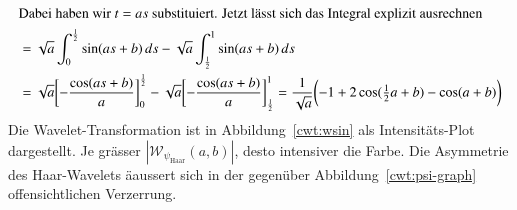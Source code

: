 \begin{beispiel}
\begin{align*}
\intertext{Dabei haben wir $t=as$ substituiert.
Jetzt lässt sich das Integral explizit ausrechnen}
&=
\sqrt{a}
\int_{0}^{\frac12} \sin(as+b)\,ds
-
\sqrt{a}
\int_{\frac12}^{1} \sin(as+b)\,ds
\\
&=
\sqrt{a}
\biggl[-\frac{\cos(as+b)}{a}\biggr]_{0}^{\frac12}
-
\sqrt{a}
\biggl[-\frac{\cos(as+b)}{a}\biggr]_{\frac12}^1
=
\frac{1}{\sqrt{a}}\biggl(
-1 + 2\cos({\textstyle\frac12}a+b) - \cos(a+b)
\biggr)
\end{align*}
Die Wavelet-Transformation ist in Abbildung~\ref{cwt:wsin} als
Intensitäts-Plot dargestellt.
Je grässer $|\mathcal{W}_{\psi_{\text{Haar}}}(a,b)|$, desto intensiver
die Farbe.
Die Asymmetrie des Haar-Wavelets äaussert sich in der gegenüber 
Abbildung~\ref{cwt:psi-graph} offensichtlichen Verzerrung.
\end{beispiel}

